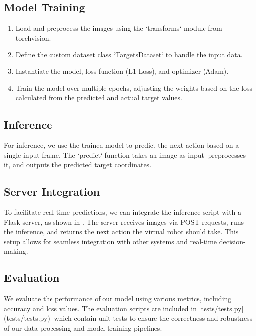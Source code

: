 \documentclass{article}
\begin{document}
\subsection{Model Training}
\begin{enumerate}
    \item Load and preprocess the images using the `transforms` module from torchvision.
    \item Define the custom dataset class `TargetsDataset` to handle the input data.
    \item Instantiate the model, loss function (L1 Loss), and optimizer (Adam).
    \item Train the model over multiple epochs, adjusting the weights based on the loss calculated from the predicted and actual target values.
\end{enumerate}

\subsection{Inference}
For inference, we use the trained model to predict the next action based on a single input frame. The `predict` function takes an image as input, preprocesses it, and outputs the predicted target coordinates.

\subsection{Server Integration}
To facilitate real-time predictions, we can integrate the inference script with a Flask server, as shown in . The server receives images via POST requests, runs the inference, and returns the next action the virtual robot should take. This setup allows for seamless integration with other systems and real-time decision-making.

\subsection{Evaluation}
We evaluate the performance of our model using various metrics, including accuracy and loss values. The evaluation scripts are included in [tests/tests.py](tests/tests.py), which contain unit tests to ensure the correctness and robustness of our data processing and model training pipelines.
\end{document}
